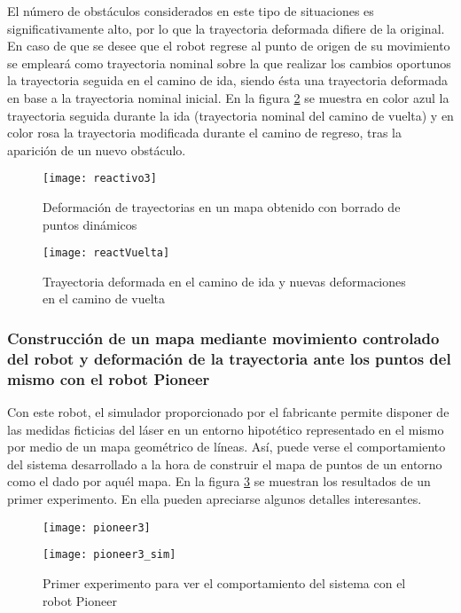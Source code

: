 El número de obstáculos considerados en este tipo de situaciones es significativamente alto, por lo que la trayectoria deformada difiere de la original. En caso de que se desee que el robot regrese al punto de origen de su movimiento se empleará como trayectoria nominal sobre la que realizar los cambios oportunos la trayectoria seguida en el camino de ida, siendo ésta una trayectoria deformada en base a la trayectoria nominal inicial. En la figura \ref{fg:reactVuelta} se muestra en color azul la trayectoria seguida durante la ida (trayectoria nominal del camino de vuelta) y en color rosa la trayectoria modificada durante el camino de regreso, tras la aparición de un nuevo obstáculo.

\begin{figure}[hb]
  \centering\texttt{[image: reactivo3]}
  \caption{Deformación de trayectorias en un mapa obtenido con borrado de puntos dinámicos}\label{fg:react3c}
\end{figure}

\begin{figure}[h]
  \centering\texttt{[image: reactVuelta]}\\
  \caption{Trayectoria deformada en el camino de ida y nuevas deformaciones en el camino de vuelta}\label{fg:reactVuelta}
\end{figure}

\clearpage

\subsubsection{Construcción de un mapa mediante movimiento controlado del robot y deformación de la trayectoria ante los puntos del mismo con el robot Pioneer}

Con este robot, el simulador proporcionado por el fabricante permite disponer de las medidas ficticias del láser en un entorno hipotético representado en el mismo por medio de un mapa geométrico de líneas. Así, puede verse el comportamiento del sistema desarrollado a la hora de construir el mapa de puntos de un entorno como el dado por aquél mapa. En la figura \ref{fg:pioneerSim1a} se muestran los resultados de un primer experimento. En ella pueden apreciarse algunos detalles interesantes.

\begin{figure}[h]
  \centering\texttt{[image: pioneer3]}

  \vspace{0.5cm}

  \centering\texttt{[image: pioneer3\_sim]}
  \caption{Primer experimento para ver el comportamiento del sistema con el robot Pioneer}\label{fg:pioneerSim1a}
\end{figure}

